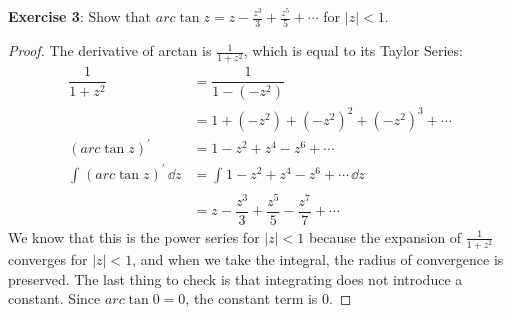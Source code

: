 \documentclass{article}
\begin{document}
\textbf{Exercise 3}: Show that $arc\tan{z} = z - \frac{z^{3}}{3} + \frac{z^{5}}{5} + \cdots$ for $\lvert z \rvert < 1$. 
    \begin{proof}
        The derivative of arctan is $\frac{1}{1 + z^{2}}$, which is equal to its Taylor Series:
            \begin{align*}
                \dfrac{1}{1 + z^{2}}             &= \dfrac{1}{1 - (-z^{2})}                                             \\
                                                 &= 1 + (-z^{2}) + (-z^{2})^{2} + (-z^{2})^{3} + \cdots                 \\
                (arc\tan{z})^{\prime}            &= 1 - z^{2} + z^{4} - z^{6} + \cdots                                  \\
                \int_{}^{} (arc\tan{z})^{\prime} \, \dd{z}  &= \int_{}^{} 1 - z^{2} + z^{4} - z^{6} + \cdots \, \dd{z}             \\
                                                 &= z - \dfrac{z^{3}}{3} + \dfrac{z^{5}}{5} - \dfrac{z^{7}}{7} + \cdots   
            \end{align*}
        We know that this is the power series for $\lvert z \rvert < 1$ because the expansion of $\frac{1}{1 + z^{2}}$ converges for $\lvert z \rvert < 1$, and when we take the integral, the radius of convergence is preserved. The last thing to check is that integrating does not introduce a constant. Since $arc\tan{0} = 0$, the constant term is $0$.
    \end{proof}

\newpage
\end{document}
